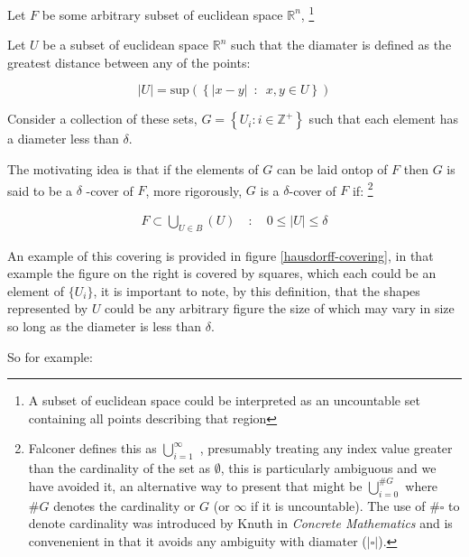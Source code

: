 \documentclass[a4paper,11pt,twoside]{article}
\begin{document}
Let \(F\) be some arbitrary subset of euclidean space \(\mathbb{R}^n\), \footnote{A subset of euclidean space could be interpreted as an uncountable set containing all points describing that region}

Let \(U\) be a subset of euclidean space \(\mathbb{R}^{n}\) such that the diamater is defined as the greatest distance between any of the points:

\[
\left\lvert U \right\rvert = \mathrm{sup}\left(\left\{ \left\lvert x- y \right\rvert \enspace : \enspace x,y \in U\right\}  \right)
\]

Consider a collection of these sets, \(G = \left\{U_i: i \in \mathbb{Z}^{+}\right\}\) such that each element has a diameter less than \(\delta\).


The motivating idea is that if the elements of \(G\) can be laid ontop of
\(F\) then \(G\) is said to be a \(\delta\) -cover of \(F\), more rigorously, \(G\) is a \(\delta\)-cover of \(F\) if: \footnote{Falconer defines this as \(\bigcup_{i=1}^{\infty}\) \cite[\S 2.1]{falconerFractalGeometryMathematical2003b},
presumably treating any index value greater than the cardinality of the set as \(\emptyset\), this is particularly ambiguous and we have avoided it, an alternative way to present that might be \(\bigcup^{\#G}_{i=0}\) where \(\#G\) denotes the cardinality or \(G\) (or \(\infty\) if it is uncountable). The use of \(\#\square\) to denote cardinality was introduced by Knuth in \emph{Concrete Mathematics} \cite{grahamConcreteMathematicsFoundation1994} and is convenenient in that it avoids any ambiguity  with diamater (\(\left\lvert \square \right\rvert\)).}

\begin{align}
    F \subset \bigcup_{U\in B} \left( U \right) \quad :\quad 0 \leq \left\lvert U \right\rvert \leq \delta \label{eq:hausdorff-covering}
\end{align}



An example of this covering is provided in figure \ref{hausdorff-covering}, in that example the figure on the right is covered by squares, which each could be an element of \(\{U_{i}\}\), it is important to note, by this definition, that the shapes represented by \(U\) could be any arbitrary figure \cite[\S 2.1]{falconerFractalGeometryMathematical2003b} the size of which may vary in size so long as the diameter is less than \(\delta\).


So for example:
\end{document}
